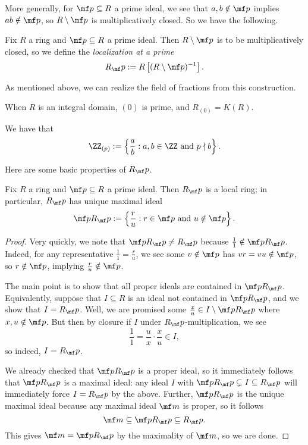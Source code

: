 \documentclass[../notes.tex]{subfiles}
\begin{document}
More generally, for $\mf p\subseteq R$ a prime ideal, we see that $a,b\notin\mf p$ implies $ab\notin\mf p$, so $R\setminus\mf p$ is multiplicatively closed. So we have the following.
\begin{definition}
	Fix $R$ a ring and $\mf p\subseteq R$ a prime ideal. Then $R\setminus\mf p$ is to be multiplicatively closed, so we define the \textit{localization at a prime}
	\[R_\mf p:=R\left[(R\setminus\mf p)^{-1}\right].\]
\end{definition}
As mentioned above, we can realize the field of fractions from this construction.
\begin{example}
	When $R$ is an integral domain, $(0)$ is prime, and $R_{(0)}=K(R)$.
\end{example}
\begin{example}
	We have that
	\[\ZZ_{(p)}:=\left\{\frac ab:a,b\in\ZZ\text{ and }p\nmid b\right\}.\]
\end{example}
Here are some basic properties of $R_\mf p$.
\begin{proposition} \label{prop:localizetolocal}
	Fix $R$ a ring and $\mf p\subseteq R$ a prime ideal. Then $R_\mf p$ is a local ring; in particular, $R_\mf p$ has unique maximal ideal
	\[\mf pR_\mf p:=\left\{\frac ru:r\in\mf p\text{ and }u\notin\mf p\right\}.\]
\end{proposition}
\begin{proof}
	Very quickly, we note that $\mf pR_\mf p\ne R_\mf p$ because $\frac11\notin\mf pR_\mf p$. Indeed, for any representative $\frac11=\frac ru$, we see some $v\notin\mf p$ has $vr=vu\notin\mf p$, so $r\notin\mf p$, implying $\frac ru\notin\mf p$.
	
	The main point is to show that all proper ideals are contained in $\mf pR_\mf p$. Equivalently, suppose that $I\subseteq R$ is an ideal not contained in $\mf pR_\mf p$, and we show that $I=R_\mf p$. Well, we are promised some $\frac xu\in I\setminus\mf pR_\mf p$ where $x,u\notin\mf p$. But then by closure if $I$ under $R_\mf p$-multiplication, we see
	\[\frac11=\frac ux\cdot\frac xu\in I,\]
	so indeed, $I=R_\mf p$.

	We already checked that $\mf pR_\mf p$ is a proper ideal, so it immediately follows that $\mf pR_\mf p$ is a maximal ideal: any ideal $I$ with $\mf pR_\mf p\subsetneq I\subseteq R_\mf p$ will immediately force $I=R_\mf p$ by the above. Further, $\mf pR_\mf p$ is the unique maximal ideal because any maximal ideal $\mf m$ is proper, so it follows
	\[\mf m\subseteq\mf pR_\mf p\subseteq R_\mf p.\]
	This gives $\mf m=\mf pR_\mf p$ by the maximality of $\mf m$, so we are done.
\end{proof}
\end{document}
